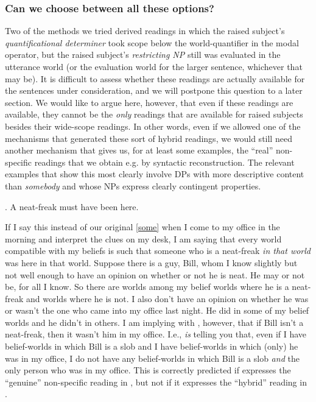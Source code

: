\subsubsection{Can we choose between all these options?}\label{semrec}

Two of the methods we tried derived readings in which the raised subject's \emph{quantificational determiner} took scope below the world-quantifier in the modal operator, but the raised subject's \emph{restricting NP} still was evaluated in the utterance world (or the evaluation world for the larger sentence, whichever that may be). It is difficult to assess whether these readings are actually available for the sentences under consideration, and we will postpone this question to a later section. We would like to argue here, however, that even if these readings are available, they cannot be the \emph{only} readings that are available for raised subjects besides their wide-scope readings. In other words, even if we allowed one of the mechanisms that generated these sort of hybrid readings, we would still need another mechanism that gives us, for at least some examples, the ``real'' non-specific readings that we obtain e.g. by syntactic reconstruction. The relevant examples that show this most clearly involve DPs with more descriptive content than \emph{somebody} and whose NPs express clearly contingent properties.

\ex. A neat-freak must have been here.

\enlargethispage{36pt}If I say this instead of our original \ref{some} when I come to my office in the morning and interpret the clues on my desk, I am saying that every world compatible with my beliefs is such that someone who is a neat-freak \emph{in that world} was here in that world. Suppose there is a guy, Bill, whom I know slightly but not well enough to have an opinion on whether or not he is neat. He may or not be, for all I know. So there are worlds among my belief worlds where he is a neat-freak and worlds where he is not. I also don't have an opinion on whether he was or wasn't the one who came into my office last night. He did in some of my belief worlds and he didn't in others. I am implying with \Last, however, that if Bill isn't a neat-freak, then it wasn't him in my office. I.e., \Last \emph{is} telling you that, even if I have belief-worlds in which Bill is a slob and I have belief-worlds in which (only) he was in my office, I do not have any belief-worlds in which Bill is a slob \emph{and} the only person who was in my office. This is correctly predicted if \Last expresses the ``genuine'' non-specific reading in \Next, but not if it expresses the ``hybrid'' reading in \NNext.

